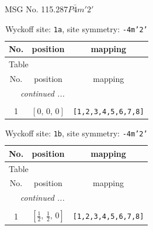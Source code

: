 \documentclass[fleqn,8pt]{jsarticle}
\begin{document}
\setcounter{MaxMatrixCols}{32}

\renewcommand{\tablename}{Table~}
\renewcommand{\figurename}{Figure~}
\begin{center}
\LARGE
MSG No. 115.287\quad$P\bar{4}m'2'$
\end{center}
\renewcommand{\arraystretch}{1.2}
\begin{longtable}{ccc}
\caption{Wyckoff site: {\tt 1a}, site symmetry: {\tt -4m'2'}}
 \\
 \hline \hline
No. & position & mapping \\ \hline \endfirsthead

\multicolumn{2}{l}{\tablename\ \thetable{}} \\
 \hline \hline
No. & position & mapping \\ \hline \endhead

 \hline \hline
\multicolumn{2}{r}{\footnotesize\it continued ...} \\ \endfoot

 \hline \hline
\multicolumn{2}{r}{} \\ \endlastfoot

1 & $\left[ 0,\, 0,\, 0 \right]$ & {\tt [1,2,3,4,5,6,7,8]} \\
\end{longtable}
\renewcommand{\arraystretch}{1.2}
\begin{longtable}{ccc}
\caption{Wyckoff site: {\tt 1b}, site symmetry: {\tt -4m'2'}}
 \\
 \hline \hline
No. & position & mapping \\ \hline \endfirsthead

\multicolumn{2}{l}{\tablename\ \thetable{}} \\
 \hline \hline
No. & position & mapping \\ \hline \endhead

 \hline \hline
\multicolumn{2}{r}{\footnotesize\it continued ...} \\ \endfoot

 \hline \hline
\multicolumn{2}{r}{} \\ \endlastfoot

1 & $\left[ \frac{1}{2},\, \frac{1}{2},\, 0 \right]$ & {\tt [1,2,3,4,5,6,7,8]} \\
\end{longtable}
\renewcommand{\arraystretch}{1.2}
\end{document}
